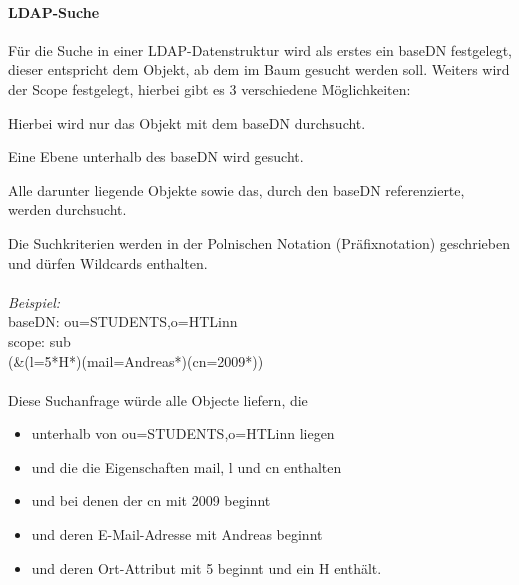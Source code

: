\paragraph{LDAP-Suche}

Für die Suche in einer LDAP-Datenstruktur wird als erstes ein baseDN festgelegt, dieser entspricht dem Objekt, ab dem im Baum gesucht werden soll. Weiters wird der Scope festgelegt, hierbei gibt es 3 verschiedene Möglichkeiten:

\begin{description}[style=nextline]
	\item[base]
		Hierbei wird nur das Objekt mit dem baseDN durchsucht.
	\item[one]
		Eine Ebene unterhalb des baseDN wird gesucht.
	\item[sub]
		Alle darunter liegende Objekte sowie das, durch den baseDN referenzierte, werden durchsucht.
\end{description}
Die Suchkriterien werden in der Polnischen Notation (Präfixnotation) geschrieben und dürfen Wildcards enthalten.\\
\\
\textit{Beispiel:}\\
baseDN: ou=STUDENTS,o=HTLinn\\
scope: sub\\
(\&(l=5*H*)(mail=Andreas*)(cn=2009*))\\
\\
Diese Suchanfrage würde alle Objecte liefern, die
\begin{itemize}
	\item
		unterhalb von ou=STUDENTS,o=HTLinn liegen 
	\item	
		und die die Eigenschaften mail, l und cn enthalten
	\item	
		und bei denen der cn mit 2009 beginnt 
	\item	
		und deren E-Mail-Adresse mit Andreas beginnt 
	\item	
		und deren Ort-Attribut mit 5 beginnt und ein H enthält.
\end{itemize}